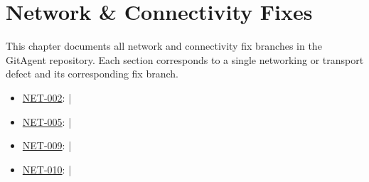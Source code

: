 \chapter{Network & Connectivity Fixes}
\label{chap:net-fixes}

This chapter documents all network and connectivity fix branches in the GitAgent repository. Each section corresponds to a single networking or transport defect and its corresponding fix branch.

\begin{itemize}
    \item \hyperref[{sec:net-002}]{NET-002}:  | 
    \item \hyperref[{sec:net-005}]{NET-005}:  | 
    \item \hyperref[{sec:net-009}]{NET-009}:  | 
    \item \hyperref[{sec:net-010}]{NET-010}:  | 
\end{itemize}









